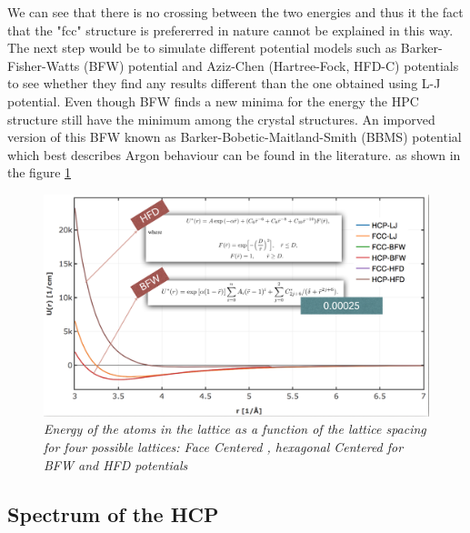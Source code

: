 \documentclass[a4paper]{article}
\begin{document}
We can see that there is no crossing between the two energies and thus it the fact that the "fcc" structure is prefererred in nature cannot be explained in this way.
The next step would be to simulate different potential models such as Barker-Fisher-Watts (BFW) potential\cite{bfw} and Aziz-Chen (Hartree-Fock, HFD-C) potentials\cite{hfd}
 to see whether they find any results different than the one obtained using L-J potential. Even though BFW finds a new minima for the energy the HPC structure still have the minimum among
 the crystal structures. An imporved version of this BFW known as Barker-Bobetic-Maitland-Smith (BBMS) potential\cite{bbms} which best describes Argon behaviour can be found in the literature. as shown in the figure \ref{diff-pot}
 \begin{figure}[h]\label{diff-pot}
    \centering
    \includegraphics[width=12cm]{diff_pot.png}
    \caption{\it \label{diff-pot}Energy of the atoms in the lattice as a function of the lattice spacing for four possible lattices: Face Centered , hexagonal Centered for BFW and HFD potentials }
\end{figure}
\subsection{Spectrum of the HCP}
\end{document}
